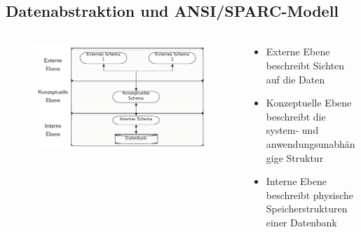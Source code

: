 	

\subsection{Datenabstraktion und ANSI/SPARC-Modell}

\begin{frame}[label=ansisparc]{\insertsection}
\framesubtitle{\insertsubsection}

	\begin{columns}
		\begin{column}{.48\textwidth}
			\begin{figure}
				\includegraphics[scale=0.35]{img/ansisparc.pdf}
			\end{figure}
		\end{column}
		\begin{column}{.48\textwidth}
			\begin{itemize}
				\item Externe Ebene beschreibt Sichten auf die Daten
				\item Konzeptuelle Ebene beschreibt die system- und anwendungsunabhängige Struktur
				\item Interne Ebene beschreibt physische Speicherstrukturen einer Datenbank
			\end{itemize}
		\end{column}
	\end{columns}
\end{frame}

